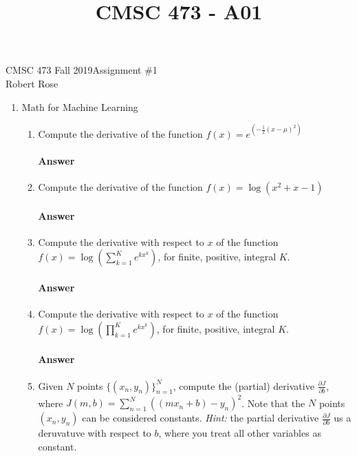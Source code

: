 \documentclass[12pt]{article}
\title{CMSC 473 - A01}
\begin{document}
CMSC 473 Fall 2019\hfill Assignment \#1\\
Robert Rose

\hrulefill

\begin{enumerate}
\item Math for Machine Learning
  \begin{enumerate}
  \item Compute the derivative of the function $f(x) = e^(-\frac{1}{2}(x - \mu)^2)$\\
  \vspace{-2.5em}
  \paragraph{Answer} 

  \item Compute the derivative of the function $f(x) = \log(x^2 + x - 1)$\\
  \vspace{-2.5em}
  \paragraph{Answer} 

  \item Compute the derivative with respect to $x$ of the function 
        $f(x) = \log(\sum_{k=1}^{K}e^{kx^k})$, for finite, positive, integral $K$.\\
  \vspace{-2.5em}
  \paragraph{Answer} 

  \item Compute the derivative with respect to $x$ of the function
        $f(x) = \log(\prod_{k=1}^{K}e^{kx^k})$, for finite, positive, integral $K$.\\
  \vspace{-2.5em}
  \paragraph{Answer} 

  \item Given $N$ points $\{(x_n,y_n)\}_{n=1}^{N}$, compute the (partial) derivative
        $\frac{\partial J}{\partial b}$, where $J(m,b) = \sum_{n=1}^{N}( ( mx_n + b ) - y_n )^2$. 
        Note that the $N$ points $(x_n, y_n)$ can be considered constants. \textit{Hint:} the
        partial derivative $\frac{\partial J}{\partial b}$ us a deruvatuve with respect to $b$,
        where you treat all other variables as constant.\\
  \vspace{-2.5em}

\end{enumerate}
\end{enumerate}
\end{document}
